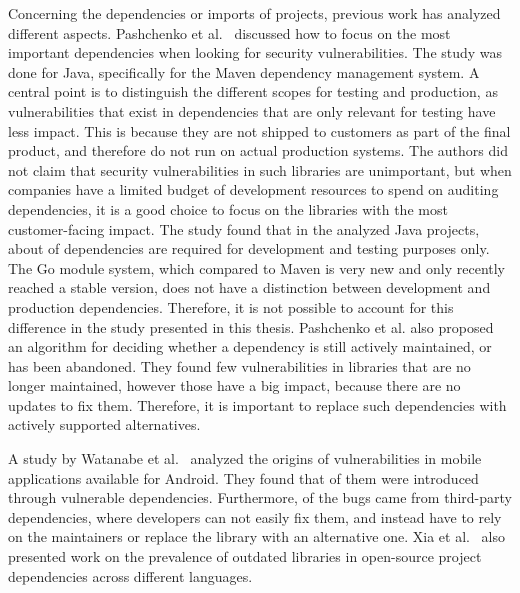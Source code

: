 Concerning the dependencies or imports of projects, previous work has analyzed different aspects.
Pashchenko et al.~\cite{pashchenko2018} discussed how to focus on the most important dependencies when looking for
security vulnerabilities.
The study was done for Java, specifically for the Maven dependency management system.
A central point is to distinguish the different scopes for testing and production, as vulnerabilities that exist in
dependencies that are only relevant for testing have less impact.
This is because they are not shipped to customers as part of the final product, and therefore do not run on actual
production systems.
The authors did not claim that security vulnerabilities in such libraries are unimportant, but when companies have a
limited budget of development resources to spend on auditing dependencies, it is a good choice to focus on the libraries
with the most customer-facing impact.
The study found that in the analyzed Java projects, about  of dependencies are required for development
and testing purposes only.
The Go module system, which compared to Maven is very new and only recently reached a stable version, does not have a
distinction between development and production dependencies.
Therefore, it is not possible to account for this difference in the study presented in this thesis.
Pashchenko et al. also proposed an algorithm for deciding whether a dependency is still actively maintained, or has been
abandoned.
They found few vulnerabilities in libraries that are no longer maintained, however those have a big impact, because
there are no updates to fix them.
Therefore, it is important to replace such dependencies with actively supported alternatives.

A study by Watanabe et al.~\cite{watanabe2017} analyzed the origins of vulnerabilities in mobile applications available
for Android.
They found that  of them were introduced through vulnerable dependencies.
Furthermore,  of the bugs came from third-party dependencies, where developers can not easily fix them,
and instead have to rely on the maintainers or replace the library with an alternative one.
Xia et al.~\cite{xia2014} also presented work on the prevalence of outdated libraries in open-source project
dependencies across different languages.

